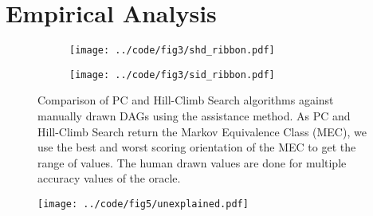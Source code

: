 \documentclass[letterpaper]{article} %
\begin{document}


\section{Empirical Analysis}
\label{sec:empirical}

\begin{figure}
	\begin{subfigure}{0.5\textwidth}
		\centering
		\texttt{[image: ../code/fig3/shd\_ribbon.pdf]}
		\caption{}
	\end{subfigure}
	\begin{subfigure}{0.5\textwidth}
		\centering
		\texttt{[image: ../code/fig3/sid\_ribbon.pdf]}
		\caption{}
	\end{subfigure}
	\caption{Comparison of PC and Hill-Climb Search algorithms against
		manually drawn DAGs using the assistance method. As PC and
		Hill-Climb Search return the Markov Equivalence Class (MEC), we
		use the best and worst scoring orientation of the MEC to get
		the range of values. The human drawn values are done for
	multiple accuracy values of the oracle. }
\end{figure}

\begin{figure}
	\centering
	\texttt{[image: ../code/fig5/unexplained.pdf]}
	\caption{}
\end{figure}
\end{document}
